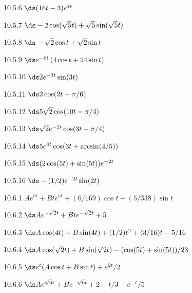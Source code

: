 \begin{Answer}{10.5.6}
 $\ds (16t-3)e^{4t}$
\end{Answer}
\begin{Answer}{10.5.7}
 $\ds -2\cos(\sqrt5t)+\sqrt{5}\sin(\sqrt{5}t)$
\end{Answer}
\begin{Answer}{10.5.8}
 $\ds -\sqrt2\cos t+\sqrt2\sin t$
\end{Answer}
\begin{Answer}{10.5.9}
 $\ds e^{-6t}\left(4\cos t+24\sin t\right)$
\end{Answer}
\begin{Answer}{10.5.10}
 $\ds 2e^{-3t}\sin(3t)$
\end{Answer}
\begin{Answer}{10.5.11}
 $\ds 2\cos(2t-\pi/6)$
\end{Answer}
\begin{Answer}{10.5.12}
 $\ds 5\sqrt2\cos(10t-\pi/4)$
\end{Answer}
\begin{Answer}{10.5.13}
 $\ds \sqrt2 e^{-2t}\cos(3t-\pi/4)$
\end{Answer}
\begin{Answer}{10.5.14}
 $\ds 5e^{4t}\cos(3t+\arcsin(4/5))$
\end{Answer}
\begin{Answer}{10.5.15}
 $\ds (2\cos(5t)+\sin(5t))e^{-2t}$
\end{Answer}
\begin{Answer}{10.5.16}
 $\ds-(1/2)e^{-2t}\sin(2t)$
\end{Answer}
\begin{Answer}{10.6.1}
 $Ae^{5t}+Bte^{5t}+(6/169)\cos t-(5/338)\sin t$
\end{Answer}
\begin{Answer}{10.6.2}
 $\ds Ae^{-\sqrt2t}+Bte^{-\sqrt2t}+5$
\end{Answer}
\begin{Answer}{10.6.3}
 $\ds A\cos(4t)+B\sin(4t)+ (1/2)t^2+(3/16)t-5/16$
\end{Answer}
\begin{Answer}{10.6.4}
 $\ds A\cos(\sqrt2t)+B\sin(\sqrt2t)-(\cos(5t)+\sin(5t))/23$
\end{Answer}
\begin{Answer}{10.6.5}
 $\ds e^{t}(A\cos t+B\sin t)+e^{2t}/2$
\end{Answer}
\begin{Answer}{10.6.6}
 $\ds Ae^{\sqrt6t}+Be^{-\sqrt6t}+2-t/3-e^{-t}/5$
\end{Answer}
